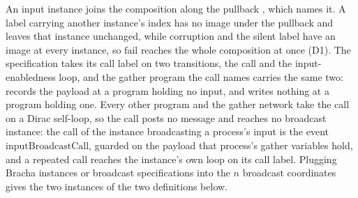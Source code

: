 \begin{definition}
  An input instance joins the composition along the pullback , which names it.
  A label carrying another instance's index has no image under the pullback and leaves that instance unchanged, while corruption and the silent label have an image at every instance, so $\mathrm{fail}$ reaches the whole composition at once (D1).
  The specification takes its call label on two transitions, the call and the input-enabledness loop, and the gather program the call names carries the same two:  records the payload at a program holding no input, and  writes nothing at a program holding one.
  Every other program and the gather network take the call on a Dirac self-loop, so the call posts no message and reaches no broadcast instance: the call of the instance broadcasting a process's input is the event $\mathrm{inputBroadcastCall}$, guarded on the payload that process's gather variables hold, and a repeated call reaches the instance's own loop on its call label.
  Plugging Bracha instances or broadcast specifications into the $n$ broadcast coordinates gives the two instances of the two definitions below.
\end{definition}

